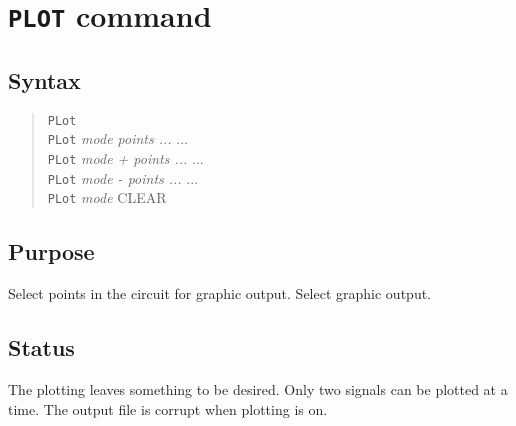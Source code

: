 %
%
%
%
\section{{\tt PLOT} command}
\subsection{Syntax}
\begin{verse}
{\tt PLot}\\
{\tt PLot} {\it mode points ...} ...\\
{\tt PLot} {\it mode + points ...} ...\\
{\tt PLot} {\it mode - points ...} ...\\
{\tt PLot} {\it mode} CLEAR
\end{verse}
\subsection{Purpose}

Select points in the circuit for graphic output.  Select graphic output.
\subsection{Status}

The plotting leaves something to be desired.  Only two signals can be
plotted at a time.  The output file is corrupt when plotting is on.

